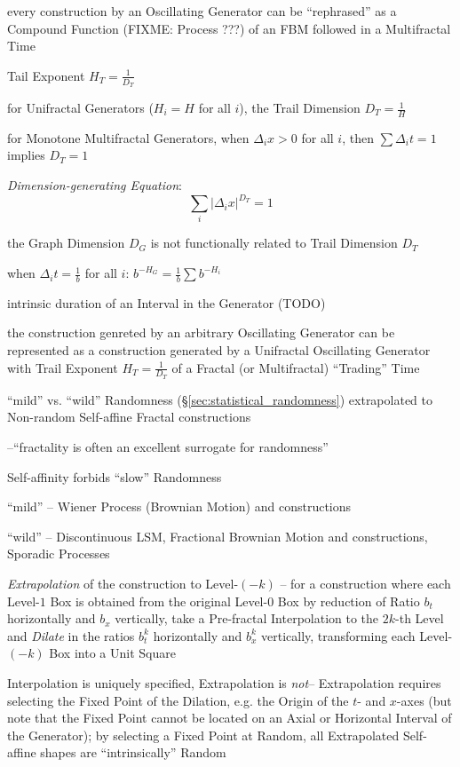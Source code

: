 every construction by an Oscillating Generator can be ``rephrased'' as a
Compound Function (FIXME: Process ???) of an FBM followed in a Multifractal Time

Tail Exponent $H_T = \frac{1}{D_T}$

for Unifractal Generators ($H_i = H$ for all $i$), the Trail Dimension
$D_T = \frac{1}{H}$

for Monotone Multifractal Generators, when $\Delta_i x > 0$ for all $i$, then
$\sum\Delta_i t = 1$ implies $D_T = 1$

\emph{Dimension-generating Equation}:
\[
  \sum_i |\Delta_i x|^{D_T} = 1
\]

the Graph Dimension $D_G$ is not functionally related to Trail Dimension $D_T$

when $\Delta_i t = \frac{1}{b}$ for all $i$:
$b^{-H_G} = \frac{1}{b} \sum b^{-H_i}$

intrinsic duration of an Interval in the Generator (TODO)

the construction genreted by an arbitrary Oscillating Generator can be
represented as a construction generated by a Unifractal Oscillating Generator
with Trail Exponent $H_T = \frac{1}{D_T}$ of a Fractal (or Multifractal)
``Trading'' Time

``mild'' vs. ``wild'' Randomness (\S\ref{sec:statistical_randomness})
extrapolated to Non-random Self-affine Fractal constructions

--``fractality is often an excellent surrogate for randomness''

Self-affinity forbids ``slow'' Randomness

``mild'' -- Wiener Process (Brownian Motion) and constructions

``wild'' -- Discontinuous LSM, Fractional Brownian Motion and constructions,
Sporadic Processes

\emph{Extrapolation} of the construction to Level-$(-k)$ -- for a construction
where each Level-$1$ Box is obtained from the original Level-$0$ Box by
reduction of Ratio $b_t$ horizontally and $b_x$ vertically, take a Pre-fractal
Interpolation to the $2k$-th Level and \emph{Dilate} in the ratios $b_t^k$
horizontally and $b_x^k$ vertically, transforming each Level-$(-k)$ Box into a
Unit Square

Interpolation is uniquely specified, Extrapolation is \emph{not}-- Extrapolation
requires selecting the Fixed Point of the Dilation, e.g. the Origin of the $t$-
and $x$-axes (but note that the Fixed Point cannot be located on an Axial or
Horizontal Interval of the Generator); by selecting a Fixed Point at Random, all
Extrapolated Self-affine shapes are ``intrinsically'' Random

